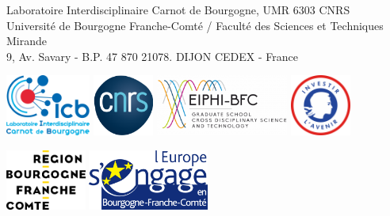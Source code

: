 \begin{titlepage}
	\begin{center}
		\normalfont \large Laboratoire Interdisciplinaire Carnot de Bourgogne, UMR 6303 CNRS\\
	Université de Bourgogne Franche-Comté / Faculté des Sciences et Techniques Mirande\\
	9, Av. Savary - B.P. 47 870 21078. DIJON CEDEX - France
	\end{center}	

	\vspace{.5cm}

	\includegraphics[height=2cm]{images/logo_icb.png}
	\hfill
	\includegraphics[height=2cm]{images/logo_cnrs.png}
	\hfill 
	\includegraphics[height=2cm]{images/logo_eiphi.png}
	\hfill
	\includegraphics[height=2cm]{images/logo_investir.png}
	\vspace{.5cm}
	\begin{center}
		\includegraphics[height=2cm]{images/logo_rbfc.png}
		\hspace{2cm}
		\includegraphics[height=2cm]{images/logo_feder.png}
	\end{center}
	
\end{titlepage}